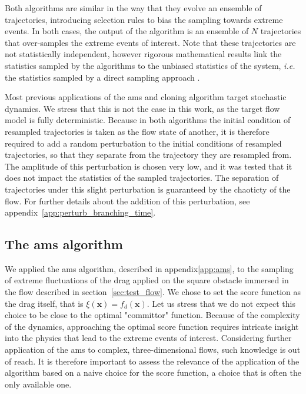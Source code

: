 Both algorithms are similar in the way that they evolve an ensemble of trajectories, introducing selection
rules to bias the sampling towards extreme events.
In both cases, the output of the algorithm is an ensemble of $N$ trajectories that over-samples the extreme
events of interest.
Note that these trajectories are not statistically independent, however rigorous mathematical results link the statistics sampled by the algorithms to the unbiased statistics of the system, \textit{i.e.} the statistics sampled by a direct sampling approach \citep{DelMoral2013, brehier:hal-01142704}.

Most previous applications of the \ac{ams} and cloning algorithm target stochastic dynamics.
We stress that this is not the case in this work, as the target flow model is fully deterministic.
Because in both algorithms the initial condition of resampled trajectories is taken as the flow state of another, it is therefore required to add a random perturbation to the initial conditions of resampled trajectories, so that they separate from the trajectory they are resampled from.
The amplitude of this perturbation is chosen very low, and it was tested that it does not impact the statistics of the sampled trajectories.
The separation of trajectories under this slight perturbation is guaranteed by the chaoticty of the flow.
For further details about the addition of this perturbation, see appendix~\ref{app:perturb_branching_time}.

\subsection{The \acl{ams} algorithm}
\label{sec:ams}
We applied the \ac{ams} algorithm, described in appendix\ref{app:ams}, to the sampling of extreme fluctuations of the drag applied on the square obstacle immersed in the flow described in section~\ref{sec:test_flow}.
We chose to set the score function as the drag itself, that is $\xi(\mathbf{x}) = f_d(\mathbf{x})$.
Let us stress that we do not expect this choice to be close to the optimal "committor" function.
Because of the complexity of the dynamics, approaching the optimal score function requires intricate insight
into the physics that lead to the extreme events of interest.
Considering further application of the \ac{ams} to complex, three-dimensional flows, such knowledge is out of reach.
It is therefore important to assess the relevance of the application of the algorithm based on a naive choice for the
score function, a choice that is often the only available one.

